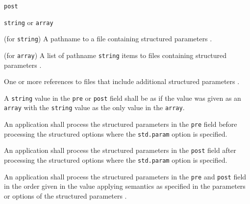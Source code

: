 \vspace{\baselineskip}


\begin{itemdescr}

	\pnum \fldname \verb|post|

	\pnum \fldtype \verb|string| or \verb|array|

	\pnum \fldval (for \verb|string|) A pathname to a file containing 
	structured parameters .

	\pnum \fldval (for \verb|array|) A list of pathname \verb|string| items to 
	files containing structured parameters .

	\pnum \flddesc
	One or more references to files that include additional structured 
	parameters .

\end{itemdescr}

A \verb|string| value in the \verb|pre| or \verb|post| field shall be as if the 
value was given as an \verb|array| with the \verb|string| value as the only 
value in the \verb|array|.

An application shall process the structured parameters  in the 
\verb|pre| field before processing the structured options where the 
\verb|std.param| option is specified.

An application shall process the structured parameters  in the 
\verb|post| field after processing the structured options where the 
\verb|std.param| option is specified.

An application shall process the structured parameters  in the 
\verb|pre| and \verb|post| field in the order given in the value applying 
semantics as specified in the parameters or options of the structured 
parameters .
